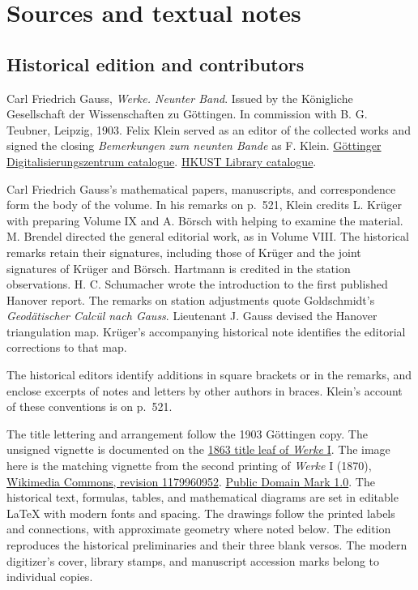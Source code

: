 \clearpage
\hypertarget{gaussix-sources}{}
\section*{Sources and textual notes}

\subsection*{Historical edition and contributors}

\noindent Carl Friedrich Gauss, \textit{Werke. Neunter Band}. Issued by the Königliche Gesellschaft der Wissenschaften zu Göttingen. In commission with B. G. Teubner, Leipzig, 1903. Felix Klein served as an editor of the collected works and signed the closing \textit{Bemerkungen zum neunten Bande} as F. Klein. \href{https://gdz.sub.uni-goettingen.de/id/PPN23601515X}{Göttinger Digitalisierungszentrum catalogue}. \href{https://lbezone.hkust.edu.hk/rse/?p=13258}{HKUST Library catalogue}.

Carl Friedrich Gauss's mathematical papers, manuscripts, and correspondence form the body of the volume. In his remarks on p.~521, Klein credits L. Krüger with preparing Volume IX and A. Börsch with helping to examine the material. M. Brendel directed the general editorial work, as in Volume VIII. The historical remarks retain their signatures, including those of Krüger and the joint signatures of Krüger and Börsch. Hartmann is credited in the station observations. H. C. Schumacher wrote the introduction to the first published Hanover report. The remarks on station adjustments quote Goldschmidt's \textit{Geodätischer Calcül nach Gauss}. Lieutenant J. Gauss devised the Hanover triangulation map. Krüger's accompanying historical note identifies the editorial corrections to that map.

The historical editors identify additions in square brackets or in the remarks, and enclose excerpts of notes and letters by other authors in braces. Klein's account of these conventions is on p.~521.

The title lettering and arrangement follow the 1903 Göttingen copy. The unsigned vignette is documented on the \href{https://gdz.sub.uni-goettingen.de/id/PPN235993352}{1863 title leaf of \textit{Werke} I}. The image here is the matching vignette from the second printing of \textit{Werke} I (1870), \href{https://commons.wikimedia.org/wiki/File:Gauss,_Carl_Friedrich_-_Vignette_-_von_Werke_(1870)_(page_9_crop).jpg}{Wikimedia Commons, revision 1179960952}. \href{https://creativecommons.org/publicdomain/mark/1.0/}{Public Domain Mark 1.0}. The historical text, formulas, tables, and mathematical diagrams are set in editable LaTeX with modern fonts and spacing. The drawings follow the printed labels and connections, with approximate geometry where noted below. The edition reproduces the historical preliminaries and their three blank versos. The modern digitizer's cover, library stamps, and manuscript accession marks belong to individual copies.

